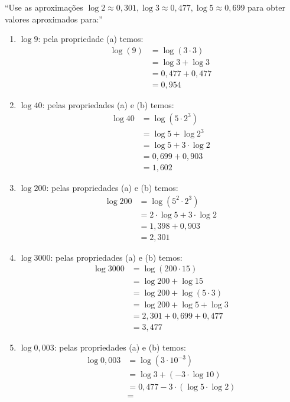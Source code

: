 \enquote{Use as aproximações $\log 2 \approx 0,301, \log 3 \approx 0,477, \log 5 \approx 0,699$ para obter valores aproximados para:}
\begin{enumerate}
    \item $\log 9$: pela propriedade (a) temos:
    \begin{align*}
        \log(9) & = \log(3 \cdot 3) \\ & = 
        \log 3 + \log 3 \\ & = 0,477 + 0,477 \\ & = 0,954
    \end{align*}
    \item $\log 40$: pelas propriedades (a) e (b) temos:
    \begin{align*}
        \log 40 & = \log (5 \cdot 2^3) \\ & = 
        \log 5 + \log 2^3 \\ & = 
        \log 5 + 3 \cdot \log 2 \\ &= 
        0,699 + 0,903 \\ & =
        1,602
    \end{align*}
    \item $\log 200$: pelas propriedades (a) e (b) temos:
    \begin{align*}
        \log 200 & = \log (5^2 \cdot 2^3) \\ & =
        2 \cdot \log 5 + 3 \cdot \log 2 \\ & =
        1,398 + 0,903 \\ & = 
        2,301
    \end{align*}
    \item $\log 3000$: pelas propriedades (a) e (b) temos:
    \begin{align*}
        \log 3000 & = \log (200 \cdot 15) \\ & =
        \log 200 + \log 15 \\ & =
        \log 200 + \log (5 \cdot 3) \\ & =
        \log 200 + \log 5 + \log 3 \\ & =
        2,301 + 0,699 + 0,477 \\ & =
        3,477
    \end{align*}
    \item $\log 0,003$: pelas propriedades (a) e (b) temos:
    \begin{align*}
        \log 0,003 & = \log (3 \cdot 10^{-3}) \\ & =
        \log 3 + (-3 \cdot \log 10) \\ & =
        0,477 - 3 \cdot (\log 5 \cdot \log 2) \\ & =

\end{align*}
\end{enumerate}
